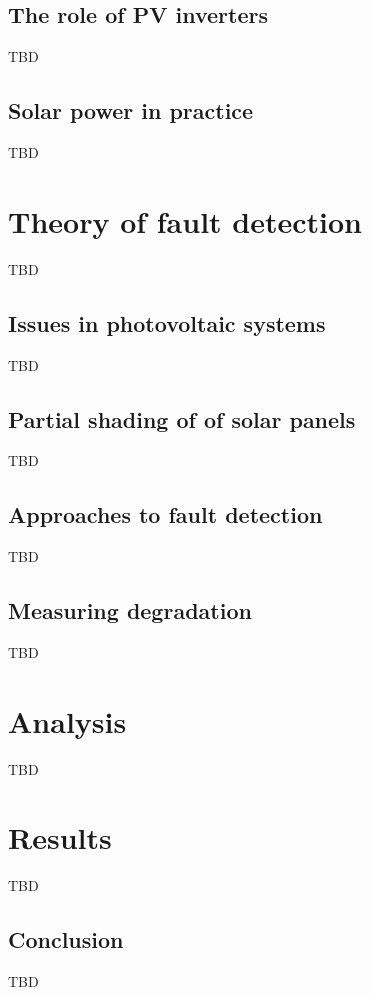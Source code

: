 
\section{The role of PV inverters}
TBD

\section{Solar power in practice}
TBD


\chapter{Theory of fault detection}
TBD

\section{Issues in photovoltaic systems}
TBD

\section{Partial shading of of solar panels}
TBD

\section{Approaches to fault detection}
TBD

\section{Measuring degradation}
TBD


\chapter{Analysis}
TBD


\chapter{Results}
TBD

\section{Conclusion}
TBD





